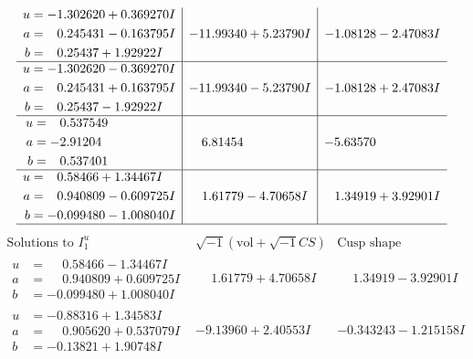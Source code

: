 \documentclass[1p]{elsarticle_modified}
\theoremstyle{definition}
\newcommand{\I}{\sqrt{-1}}
\begin{document}
$$\begin{array}{c|c|c}
\begin{aligned}
u &= -1.302620 + 0.369270 I \\
a &= \phantom{-}0.245431 - 0.163795 I \\
b &= \phantom{-}0.25437 + 1.92922 I\end{aligned}
 & -11.99340 + 5.23790 I & -1.08128 - 2.47083 I \\ \hline\begin{aligned}
u &= -1.302620 - 0.369270 I \\
a &= \phantom{-}0.245431 + 0.163795 I \\
b &= \phantom{-}0.25437 - 1.92922 I\end{aligned}
 & -11.99340 - 5.23790 I & -1.08128 + 2.47083 I \\ \hline\begin{aligned}
u &= \phantom{-}0.537549\phantom{ +0.000000I} \\
a &= -2.91204\phantom{ +0.000000I} \\
b &= \phantom{-}0.537401\phantom{ +0.000000I}\end{aligned}
 & \phantom{-}6.81454\phantom{ +0.000000I} & -5.63570\phantom{ +0.000000I} \\ \hline\begin{aligned}
u &= \phantom{-}0.58466 + 1.34467 I \\
a &= \phantom{-}0.940809 - 0.609725 I \\
b &= -0.099480 - 1.008040 I\end{aligned}
 & \phantom{-}1.61779 - 4.70658 I & \phantom{-}1.34919 + 3.92901 I\\
 \hline 
 \end{array}$$\newpage$$\begin{array}{c|c|c}  
\text{Solutions to }I^u_{1}& \I (\text{vol} + \sqrt{-1}CS) & \text{Cusp shape}\\
 \hline 
\begin{aligned}
u &= \phantom{-}0.58466 - 1.34467 I \\
a &= \phantom{-}0.940809 + 0.609725 I \\
b &= -0.099480 + 1.008040 I\end{aligned}
 & \phantom{-}1.61779 + 4.70658 I & \phantom{-}1.34919 - 3.92901 I \\ \hline\begin{aligned}
u &= -0.88316 + 1.34583 I \\
a &= \phantom{-}0.905620 + 0.537079 I \\
b &= -0.13821 + 1.90748 I\end{aligned}
 & -9.13960 + 2.40553 I & -0.343243 - 1.215158 I \\ \hline\begin{aligned}

\end{aligned}
\end{array}$$
\end{document}
